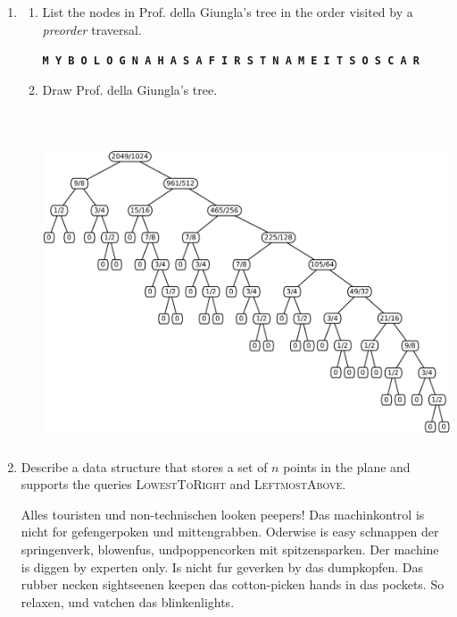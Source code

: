 \documentclass[11pt]{article}
\begin{document}
\begin{enumerate}
\begin{enumerate}
\end{enumerate}

\def\symbol#1{\textbf{\texttt{#1}}}
\newpage
\item
\begin{enumerate}
\item
List the nodes in Prof. della Giungla's tree in the order visited by a \emph{preorder} traversal. 

\begin{solution}
\symbol{M Y B O L O G N A H A S A F I R S T N A M E I T S O S C A R}
\end{solution}

\item
Draw Prof. della Giungla's tree.

\begin{solution}~

\begin{center}
\includegraphics[height=3.5in]{Fig/wrong-tree}
\end{center}
\end{solution}

\end{enumerate}

\newpage
\item
Describe a data structure that stores a set of $n$ points in the plane and supports the queries \textsc{\textrm{LowestToRight}} and \textsc{\textrm{LeftmostAbove}}.

\begin{solution}
Alles touristen und non-technischen looken peepers! Das machinkontrol is nicht for gefengerpoken und mittengrabben. Oderwise is easy schnappen der springenverk, blowenfus, undpoppencorken mit spitzensparken. Der machine is diggen by experten only. Is nicht fur geverken by das dumpkopfen. Das rubber necken sightseenen keepen das cotton-picken hands in das pockets. So relaxen, und vatchen das blinkenlights. 


\end{solution}
\end{enumerate}
\end{document}
